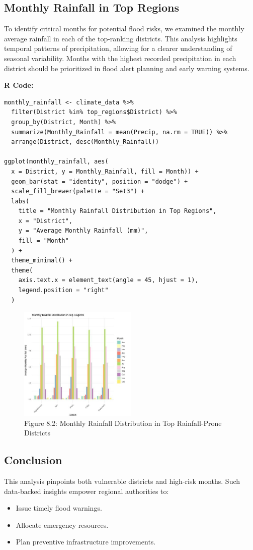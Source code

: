 \subsection*{Monthly Rainfall in Top Regions}

To identify critical months for potential flood risks, we examined the monthly average rainfall in each of the top-ranking districts. This analysis highlights temporal patterns of precipitation, allowing for a clearer understanding of seasonal variability. Months with the highest recorded precipitation in each district should be prioritized in flood alert planning and early warning systems.


\textbf{R Code:}
\begin{verbatim}
monthly_rainfall <- climate_data %>%
  filter(District %in% top_regions$District) %>%
  group_by(District, Month) %>%
  summarize(Monthly_Rainfall = mean(Precip, na.rm = TRUE)) %>%
  arrange(District, desc(Monthly_Rainfall))

ggplot(monthly_rainfall, aes(
  x = District, y = Monthly_Rainfall, fill = Month)) +
  geom_bar(stat = "identity", position = "dodge") +
  scale_fill_brewer(palette = "Set3") +
  labs(
    title = "Monthly Rainfall Distribution in Top Regions",
    x = "District",
    y = "Average Monthly Rainfall (mm)",
    fill = "Month"
  ) +
  theme_minimal() +
  theme(
    axis.text.x = element_text(angle = 45, hjust = 1),
    legend.position = "right"
  )
\end{verbatim}

\begin{figure}[h]
\centering
\includegraphics[width=0.5\textwidth]{figures/case2.jpg}
\caption{Figure 8.2: Monthly Rainfall Distribution in Top Rainfall-Prone Districts}
\end{figure}

\subsection*{Conclusion}

This analysis pinpoints both vulnerable districts and high-risk months. Such data-backed insights empower regional authorities to:
\begin{itemize}
    \item Issue timely flood warnings.
    \item Allocate emergency resources.
    \item Plan preventive infrastructure improvements.
\end{itemize}
